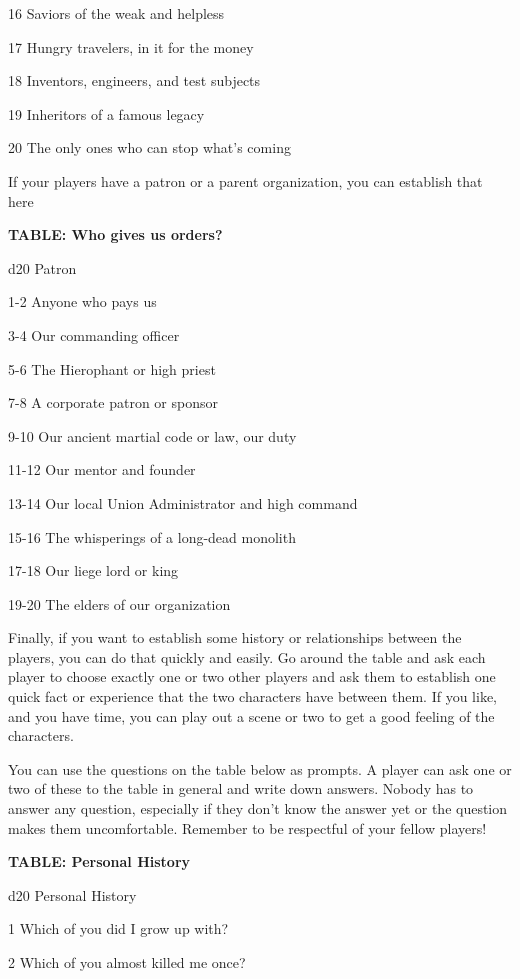  16       Saviors of the weak and helpless

  17       Hungry travelers, in it for the money

  18       Inventors, engineers, and test subjects

  19       Inheritors of a famous legacy

  20       The only ones who can stop what’s coming

If your players have a patron or a parent organization, you can establish that here

\textbf{TABLE: Who gives us orders?}

 d20       Patron

 1-2       Anyone who pays us

 3-4       Our commanding officer

 5-6       The Hierophant or high priest

 7-8       A corporate patron or sponsor

 9-10      Our ancient martial code or law, our duty

 11-12     Our mentor and founder

 13-14     Our local Union Administrator and high command

 15-16     The whisperings of a long-dead monolith

 17-18     Our liege lord or king

 19-20     The elders of our organization

Finally, if you want to establish some history or relationships between the players, you can do
that quickly and easily. Go around the table and ask each player to choose exactly one or two
other players and ask them to establish one quick fact or experience that the two characters
have between them. If you like, and you have time, you can play out a scene or two to get a
good feeling of the characters.

You can use the questions on the table below as prompts. A player can ask one or two of these
to the table in general and write down answers. Nobody has to answer any question, especially if
they don’t know the answer yet or the question makes them uncomfortable. Remember to be
respectful of your fellow players!

\textbf{TABLE: Personal History}

 d20       Personal	History

 1         Which of you did I grow up with?

 2         Which of you almost killed me once?

